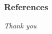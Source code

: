 \ifx\buildtype\btproblems
    
\fi

\ifx\buildtype\bttechnicalslides
  
  \ifbuildhasbibliography
    \begin{frame}
      \frametitle{References}
      \printbibliography
    \end{frame}
  \fi

  \begin{frame}{}
    \centering \Large
    \emph{Thank you}
  \end{frame}
  
    
\fi


